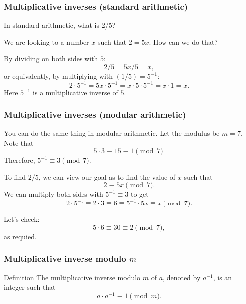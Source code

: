 \begin{frame}
  \frametitle{Multiplicative inverses (standard arithmetic)}

  In standard arithmetic, what is 2/5?

  \pause

  We are looking to a number $x$ such that $2 = 5x$.  How can we do that?

  \pause

  By dividing on both sides with $5$:
  \[
  2/5 = 5x/5 = x,
  \]
  \pause
  or equivalently, by multiplying with $(1/5)=5^{-1}$:
  \[
  2\cdot 5^{-1} = 5x\cdot5^{-1} = x\cdot 5\cdot 5^{-1} = x\cdot 1 = x.
  \]
  Here $5^{-1}$ is a multiplicative inverse of $5$.
\end{frame}

\begin{frame}
  \frametitle{Multiplicative inverses (modular arithmetic)}
  
  You can do the same thing in modular arithmetic.  Let the
  modulus be $m=7$.  Note that
  \[
  5\cdot 3 \equiv 15 \equiv 1 \pmod 7.
  \]
  Therefore, $5^{-1}\equiv 3 \pmod 7$.

  \pause
  \vspace{0.1in}
  To find $2/5$, we can view our goal as to find the value of $x$ such that
  \[
  2 \equiv 5x \pmod 7.
  \]
  We can multiply both sides with $5^{-1}\equiv 3$ to get
  \[
  2\cdot 5^{-1} \equiv 2\cdot 3 \equiv 6 \equiv 5^{-1}\cdot 5x \equiv x \pmod 7.
  \]
  \pause

  Let's check:
  \[
  5\cdot 6 \equiv 30 \equiv 2 \pmod 7,
  \]
  as requied.
  
\end{frame}

\begin{frame}
  \frametitle{Multiplicative inverse modulo $m$}

  \begin{block}{Definition}
    The multiplicative inverse modulo $m$ of $a$, denoted by $a^{-1}$,
    is an integer such that
    \[
    a\cdot a^{-1}\equiv 1 \pmod m.
    \]
  \end{block}
\end{frame}

